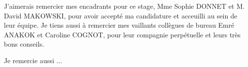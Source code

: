 \documentclass{book}
\begin{document}
\noindent
\large{J'aimerais remercier mes encadrants pour ce stage, Mme Sophie DONNET et
    M. David MAKOWSKI, pour avoir accepté ma candidature et acceuilli au sein de
    leur équipe. Je tiens aussi à remercier mes vaillants collègues de bureau Emré
    ANAKOK et Caroline COGNOT, pour leur compagnie perpétuelle et leurs très bons
    conseils.}
\par %
{Je remercie aussi ...}
\thispagestyle{fancy}
\clearpage %


\newpage
\mbox{} %
\thispagestyle{fancy}


\newpage
\fancyhead[LE,RO]{\leftmark}
\tableofcontents %
\thispagestyle{fancy}


\newpage
\mbox{} %


\newpage
\listoffigures %
\thispagestyle{fancy}


\newpage
\mbox{} %

\end{document}
